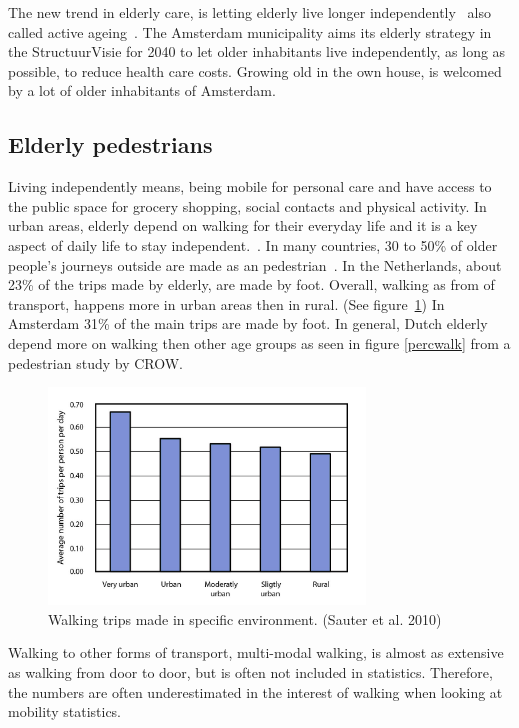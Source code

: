 The new trend in elderly care, is letting elderly live longer independently~\cite{MENSenSTRAAT2014, VandeRidder2008} also called active ageing~\cite{Annear2014}. The Amsterdam municipality aims its elderly strategy in the StructuurVisie for 2040 to let older inhabitants live independently, as long as possible, to reduce health care costs. Growing old in the own house, is welcomed by a lot of older inhabitants of Amsterdam.~\cite{Bossink2011}

\subsection{Elderly pedestrians}
Living independently means, being mobile for personal care and have access to the public space for grocery shopping, social contacts and physical activity. In urban areas, elderly depend on walking for their everyday life and it is a key aspect of daily life to stay independent.~\cite{OECD2001}.
In many countries, 30 to 50\% of older people's journeys outside are made as an pedestrian~\cite{Stahl2013}. In the Netherlands, about 23\% of the trips made by elderly, are made by foot. Overall, walking as from of transport, happens more in urban areas then in rural. (See figure~\ref{walktrip}) In Amsterdam 31\% of the main trips are made by foot. In general, Dutch elderly depend more on walking then other age groups as seen in figure \ref{percwalk} from a pedestrian study by CROW.~\cite{Eijnde2011, Sauter2010, Crow2014}

\begin{figure}[h]
\includegraphics[width=0.75\textwidth]{img/I_UrbanWalks-01.jpg}
\centering
\caption[Walking trips made in specific environment.]{Walking trips made in specific environment. (Sauter et al. 2010)
\label{walktrip}} 
\end{figure}

Walking to other forms of transport, multi-modal walking, is almost as extensive as walking from door to door, but is often not included in statistics. Therefore, the numbers are often underestimated in the interest of walking when looking at mobility statistics.~\cite{VeiligheidNL2012, Sauter2010}


